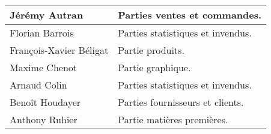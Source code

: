    \begin{center}
        \begin{tabular}{|l|l|}
            \hline
                Jérémy Autran & Parties ventes et commandes. \\
            \hline
                Florian Barrois & Parties statistiques et invendus. \\
            \hline
                François-Xavier Béligat & Partie produits. \\
            \hline
                Maxime Chenot & Partie graphique. \\
            \hline
                Arnaud Colin & Parties statistiques et invendus. \\
            \hline
                Benoît Houdayer & Parties fournisseurs et clients. \\
            \hline
                Anthony Ruhier & Partie matières premières. \\
            \hline
        \end{tabular}
    \end{center}



